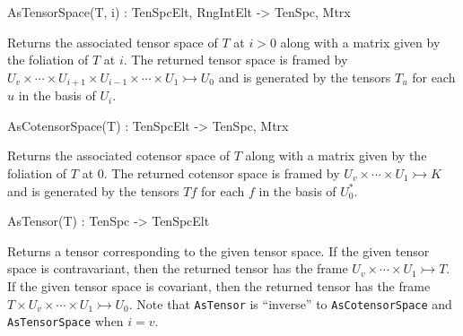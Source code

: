 \begin{intrinsics}
AsTensorSpace(T, i) : TenSpcElt, RngIntElt -> TenSpc, Mtrx
\end{intrinsics}

Returns the associated tensor space of $T$ at $i>0$ along with a matrix given by
the foliation of $T$ at $i$. 
The returned tensor space is framed by 
$U_v\times \cdots \times U_{i+1}\times U_{i-1}\times \cdots \times U_1\rightarrowtail U_0$
and is generated by the tensors $T_u$ for each $u$ in the basis of $U_i$.

\begin{intrinsics}
AsCotensorSpace(T) : TenSpcElt -> TenSpc, Mtrx
\end{intrinsics}

Returns the associated cotensor space of $T$ along with a matrix given by
the foliation of $T$ at $0$. 
The returned cotensor space is framed by 
$U_v\times \cdots \times U_1\rightarrowtail K$
and is generated by the tensors $Tf$ for each $f$ in the basis of $U_0^*$.

\begin{intrinsics}
AsTensor(T) : TenSpc -> TenSpcElt
\end{intrinsics}

Returns a tensor corresponding to the given tensor space. 
If the given tensor space is contravariant, then the returned tensor has the frame $U_v\times \cdots \times U_1\rightarrowtail T$.
If the given tensor space is covariant, then the returned tensor has the frame $T\times U_v\times \cdots \times U_1\rightarrowtail U_0$.
Note that {\tt AsTensor} is ``inverse'' to {\tt AsCotensorSpace} and {\tt AsTensorSpace} when $i=v$.

